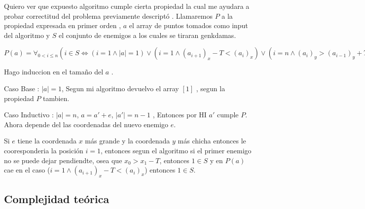         Quiero ver que expuesto algoritmo cumple cierta propiedad la cual me ayudara a probar correctitud del problema previamente descriptó . Llamaremos $P$ a la propiedad expresada en primer orden , $a$ el array de puntos tomados como input del algoritmo y $S$ el conjunto de enemigos a los cuales se tiraran genkdamas. 
        
        $P(a) = \forall_{0 < i \leq n} ( i \in S  \iff (i = 1 \land |a| = 1 ) \lor ( i = 1  \land (a_{i+1})_x - T  < (a_i)_x ) \lor ( i = n \land (a_i)_y > (a_{i - 1})_y + T ) \lor ( (1 < i < n) \land ( (a_{i+1})_x - T  < (a_i)_x ) ) \land ( (a_i)_y > (a_{i - 1})_y + T ) ) )  $
        
        Hago induccion en el tamaño del $a$ .


        Caso Base : $|a| = 1$, Segun mi algoritmo devuelvo el array $[1]$ , segun la propiedad $P$ tambien.

        Caso Inductivo : $|a| = n$, $a = a' + e $, $|a'| = n - 1$ , Entonces por HI $a'$ cumple $P$. Ahora depende del las coordenadas del nuevo enemigo $e$. 

        Si $e$ tiene la coordenada $x$ más grande y la coordenada $y$ más chicha entonces le cooresponderia la posición $i = 1$, entonces segun el algoritmo si el primer enemigo no se puede dejar pendiendte, osea que $x_0 > x_1  - T$, entonces $1 \in S$ y en $P(a)$ cae en el caso  ($i = 1  \land (a_{i+1})_x - T  < (a_i)_x$) entonces $1 \in S$.





       
    \subsection{Complejidad teórica}
         
       


